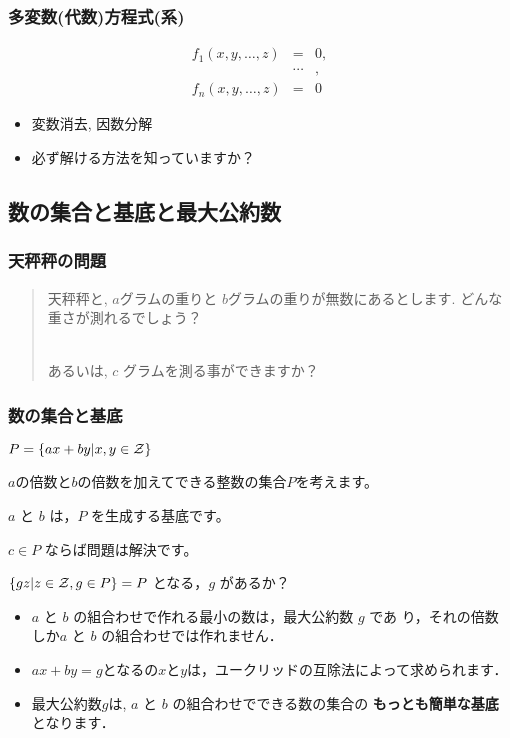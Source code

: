 \documentclass[dvipdfmx,11pt,notheorems]{beamer}
\theoremstyle{definition}
\begin{document}
\begin{frame}\frametitle{多変数(代数)方程式(系)}
  \[
  \begin{array}{rcl}
    f_1(x, y, \ldots, z) & = & 0, \\
    &\cdots&, \\
    f_n(x, y, \ldots, z) & = & 0
  \end{array}
  \]
  
\begin{itemize}
\item 変数消去, 因数分解
\item 必ず解ける方法を知っていますか？
\end{itemize}
\end{frame}

\subsection{数の集合と基底と最大公約数}

\begin{frame}\frametitle{天秤秤の問題}
\begin{quote}
天秤秤と, $a$グラムの重りと $b$グラムの重りが無数にあるとします.
どんな重さが測れるでしょう？

\ \\

あるいは, $c$ グラムを測る事ができますか？
\end{quote}
\end{frame}

\begin{frame}\frametitle{数の集合と基底}

\begin{block}{$ P = \left\{ a x + b y | x, y \in {\cal Z} \right\} $}

$a$の倍数と$b$の倍数を加えてできる整数の集合$P$を考えます。

$a$ と $b$ は，$P$ を生成する基底です。

\end{block}

$ c \in P $ ならば問題は解決です。

\begin{block}{$ \left\{ g z | z \in {\cal Z}, g \in P \right\} = P$ となる，$g$ があるか？}

\begin{itemize}
\item $a$ と $b$ の組合わせで作れる最小の数は，最大公約数 $g$ であ
り，それの倍数しか$a$ と $b$ の組合わせでは作れません．

\item $ a x + b y = g $となるの$x$と$y$は，ユークリッドの互除法によって求められます．

\item 最大公約数$g$は, $a$ と $b$ の組合わせでできる数の集合の
{\bf もっとも簡単な基底} となります．
\end{itemize}
\end{block}
\end{frame}
\end{document}
